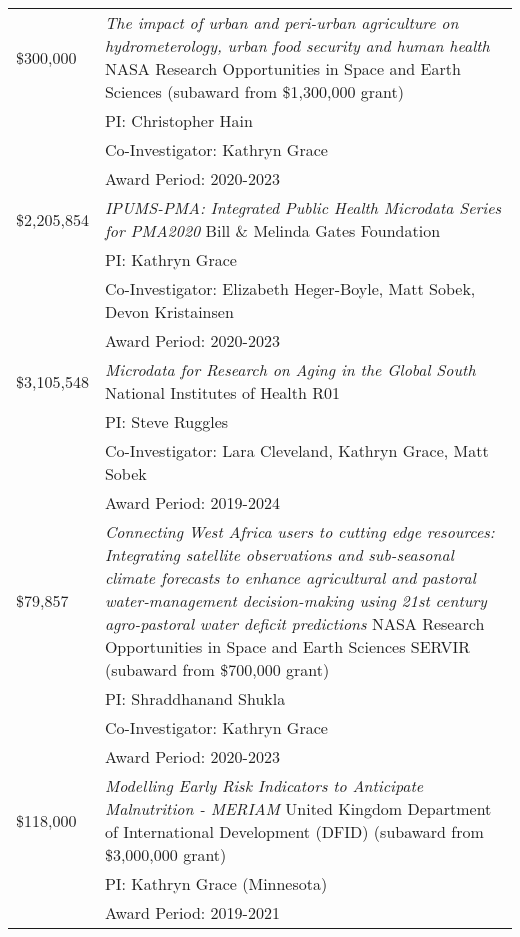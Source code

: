 \documentclass[11pt]{article} %
\begin{document}
\begin{tabular}{lp{11cm}}

\$300,000 & \emph{The impact of urban and peri-urban agriculture on hydrometerology, urban food security and human health} NASA Research Opportunities in Space and Earth Sciences (subaward from \$1,300,000 grant)\\
&PI: Christopher Hain\\
&Co-Investigator: Kathryn Grace\\
&Award Period: 2020-2023\\



\$2,205,854 & \emph{IPUMS-PMA: Integrated Public Health Microdata Series for PMA2020} Bill \& Melinda Gates Foundation\\
&PI: Kathryn Grace\\
&Co-Investigator: Elizabeth Heger-Boyle, Matt Sobek, Devon Kristainsen\\
&Award Period: 2020-2023 \\
 

\$3,105,548 & \emph{Microdata for Research on Aging in the Global South} National Institutes of Health R01\\
&PI: Steve Ruggles\\
&Co-Investigator: Lara Cleveland, Kathryn Grace, Matt Sobek\\
&Award Period: 2019-2024\\



\$79,857 & \emph{Connecting West Africa users to cutting edge resources: Integrating satellite observations and sub-seasonal climate forecasts to enhance agricultural and pastoral water-management decision-making using 21st century agro-pastoral water deficit predictions} NASA Research Opportunities in Space and Earth Sciences SERVIR (subaward from \$700,000 grant)\\
&PI: Shraddhanand Shukla\\
&Co-Investigator: Kathryn Grace\\
&Award Period: 2020-2023\\



\$118,000 & \emph{Modelling Early Risk Indicators to Anticipate Malnutrition - MERIAM} United Kingdom Department of International Development (DFID) (subaward from \$3,000,000 grant)\\
&PI: Kathryn Grace (Minnesota)\\
&Award Period: 2019-2021\\





\end{tabular}
\end{document}
